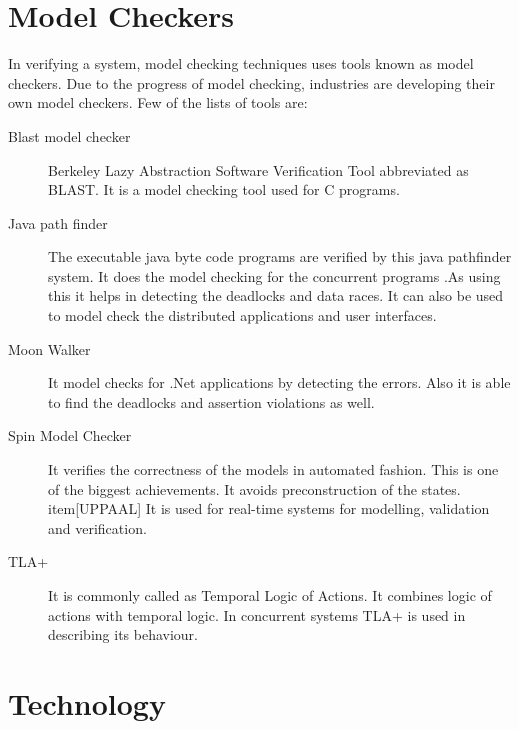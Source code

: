 \documentclass{article}
\begin{document}
\section{Model Checkers}
\label{sec:modelcheckers}


In verifying a system, model checking techniques uses tools known as model checkers. Due to the progress of model checking, industries are developing their own model checkers. 
Few of the lists of tools are:
\begin{description}
\item[Blast model checker] Berkeley Lazy Abstraction Software Verification Tool abbreviated as BLAST. It is a model checking tool used for C programs.
\item[Java path finder] The executable java byte code programs are verified by this java pathfinder system. It does the model checking for the concurrent programs .As using this it helps in detecting the deadlocks and data races. It can also be used to model check the distributed applications and user interfaces.
\item[Moon Walker] It model checks for .Net applications by detecting the errors. Also it is able to find the deadlocks and assertion violations as well.
\item[Spin Model Checker]It verifies the correctness of the models in automated fashion. This is one of the biggest achievements. It avoids preconstruction of the states.
item[UPPAAL] It is used for real-time systems for modelling, validation and verification.
\item[TLA+] It is commonly called as Temporal Logic of Actions. It combines logic of actions with  temporal logic. In concurrent systems TLA+ is used in describing its behaviour.
\end{description}


\section{Technology}
\label{sec:Technology}
\end{document}
